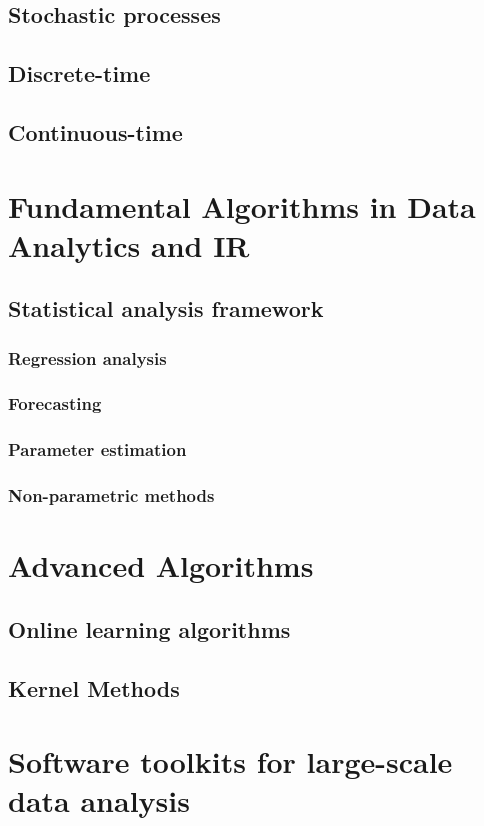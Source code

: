 \documentclass[]{book}    %
\begin{document}
\section{Stochastic processes}
\section{Discrete-time}
\section{Continuous-time}

\chapter{Fundamental Algorithms in Data Analytics and IR}
\section{Statistical analysis framework}
\subsection{Regression analysis}
\subsection{Forecasting}
\subsection{Parameter estimation}
\subsection{Non-parametric methods}

\chapter{Advanced Algorithms}
\section{Online learning algorithms}
\section{Kernel Methods}

\chapter{Software toolkits for large-scale data analysis}
\end{document}
